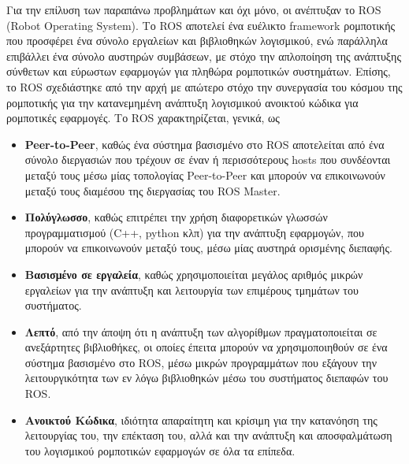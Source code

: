 \bigskip
Για την επίλυση των παραπάνω προβλημάτων και όχι μόνο, οι \citeauthor{ros} \cite{ros} ανέπτυξαν το ROS (Robot Operating System). Το ROS αποτελεί ένα ευέλικτο framework ρομποτικής που προσφέρει ένα σύνολο εργαλείων και βιβλιοθηκών λογισμικού, ενώ παράλληλα επιβάλλει ένα σύνολο αυστηρών συμβάσεων, με στόχο την απλοποίηση της ανάπτυξης σύνθετων και εύρωστων εφαρμογών για πληθώρα ρομποτικών συστημάτων. Επίσης, το ROS σχεδιάστηκε από την αρχή με απώτερο στόχο την συνεργασία του κόσμου της ρομποτικής για την κατανεμημένη ανάπτυξη λογισμικού ανοικτού κώδικα για ρομποτικές εφαρμογές. Το ROS χαρακτηρίζεται, γενικά, ως
\begin{itemize}
	\item \textbf{Peer-to-Peer}, καθώς ένα σύστημα βασισμένο στο ROS αποτελείται από ένα σύνολο διεργασιών που τρέχουν σε έναν ή περισσότερους hosts που συνδέονται μεταξύ τους μέσω μίας τοπολογίας Peer-to-Peer και μπορούν να επικοινωνούν μεταξύ τους διαμέσου της διεργασίας του ROS Master.
	\item \textbf{Πολύγλωσσο}, καθώς επιτρέπει την χρήση διαφορετικών γλωσσών προγραμματισμού (C++, python κλπ) για την ανάπτυξη εφαρμογών, που μπορούν να επικοινωνούν μεταξύ τους, μέσω μίας αυστηρά ορισμένης διεπαφής.
	\item \textbf{Βασισμένο σε εργαλεία}, καθώς χρησιμοποιείται μεγάλος αριθμός μικρών εργαλείων για την ανάπτυξη και λειτουργία των επιμέρους τμημάτων του συστήματος.
	\item \textbf{Λεπτό}, από την άποψη ότι η ανάπτυξη των αλγορίθμων πραγματοποιείται σε ανεξάρτητες βιβλιοθήκες, οι οποίες έπειτα μπορούν να χρησιμοποιηθούν σε ένα σύστημα βασισμένο στο ROS, μέσω μικρών προγραμμάτων που εξάγουν την λειτουργικότητα των εν λόγω βιβλιοθηκών μέσω του συστήματος διεπαφών του ROS.
	\item \textbf{Ανοικτού Κώδικα}, ιδιότητα απαραίτητη και κρίσιμη για την κατανόηση της λειτουργίας του, την επέκταση του, αλλά και την ανάπτυξη και αποσφαλμάτωση του λογισμικού ρομποτικών εφαρμογών σε όλα τα επίπεδα.
\end{itemize}

